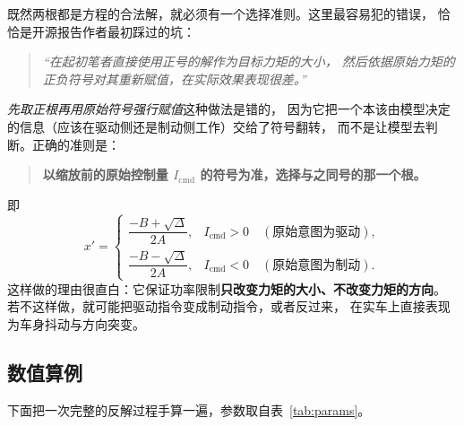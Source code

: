 \documentclass[cn,blue,11pt,device=normal]{elegantnote}
\newcommand{\Icmd}{I_{\mathrm{cmd}}{}}
\begin{document}
既然两根都是方程的合法解，就必须有一个选择准则。这里最容易犯的错误，
恰恰是开源报告作者最初踩过的坑：

\begin{quote}
\itshape
“在起初笔者直接使用正号的解作为目标力矩的大小，
然后依据原始力矩的正负符号对其重新赋值，在实际效果表现很差。”
\end{quote}

\emph{先取正根再用原始符号强行赋值}这种做法是错的，
因为它把一个本该由模型决定的信息（应该在驱动侧还是制动侧工作）交给了符号翻转，
而不是让模型去判断。正确的准则是：

\begin{quote}
\textbf{以缩放前的原始控制量 $\Icmd$ 的符号为准，选择与之同号的那一个根。}
\end{quote}

即
\begin{equation}\label{eq:rootselect}
  x' =
  \begin{cases}
    \dfrac{-B + \sqrt{\Delta}}{2A}, & \Icmd > 0 \quad(\text{原始意图为驱动}),\\[10pt]
    \dfrac{-B - \sqrt{\Delta}}{2A}, & \Icmd < 0 \quad(\text{原始意图为制动}).
  \end{cases}
\end{equation}
这样做的理由很直白：它保证功率限制\textbf{只改变力矩的大小、不改变力矩的方向}。
若不这样做，就可能把驱动指令变成制动指令，或者反过来，
在实车上直接表现为车身抖动与方向突变。

\subsection{数值算例}

下面把一次完整的反解过程手算一遍，参数取自表~\ref{tab:params}。
\end{document}
